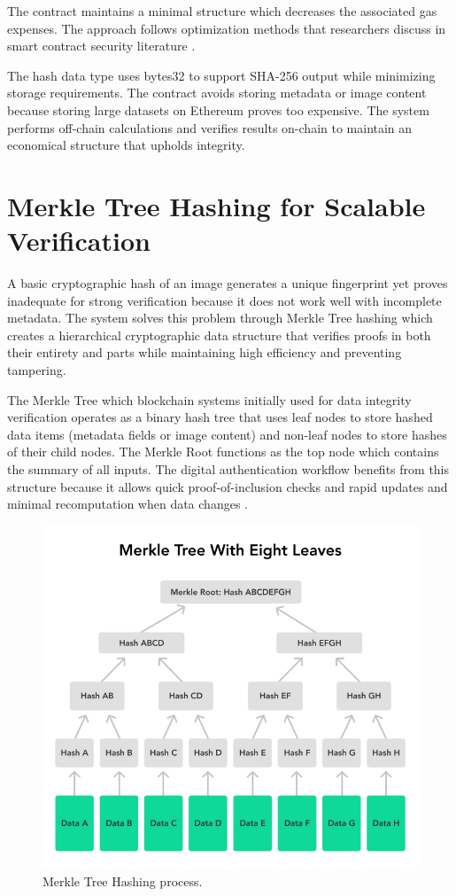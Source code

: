 The contract maintains a minimal structure which decreases the associated gas expenses. The approach follows optimization methods that researchers discuss in smart contract security literature \cite{blockChainAndBeyod}.

The hash data type uses bytes32 to support SHA-256 output while minimizing storage requirements. The contract avoids storing metadata or image content because storing large datasets on Ethereum proves too expensive. The system performs off-chain calculations and verifies results on-chain to maintain an economical structure that upholds integrity.


\section{Merkle Tree Hashing for Scalable Verification}
A basic cryptographic hash of an image generates a unique fingerprint yet proves inadequate for strong verification because it does not work well with incomplete metadata. The system solves this problem through Merkle Tree hashing which creates a hierarchical cryptographic data structure that verifies proofs in both their entirety and parts while maintaining high efficiency and preventing tampering.

The Merkle Tree which blockchain systems initially used for data integrity verification operates as a binary hash tree that uses leaf nodes to store hashed data items (metadata fields or image content) and non-leaf nodes to store hashes of their child nodes. The Merkle Root functions as the top node which contains the summary of all inputs. The digital authentication workflow benefits from this structure because it allows quick proof-of-inclusion checks and rapid updates and minimal recomputation when data changes \cite{forensicAnalysisOfJPEG}.

\begin{figure}
    \centering
    \includegraphics[scale=0.5]{images/merkleTreeHash.png}
    \caption{Merkle Tree Hashing process.}
    \label{fig:merkleTree}
\end{figure}


